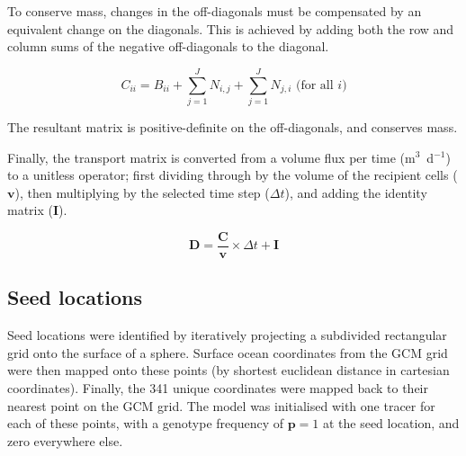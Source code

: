 \documentclass[12pt]{article}
\begin{document}
To conserve mass, changes in the off-diagonals must be compensated by an equivalent change on the diagonals. This is achieved by adding both the row and column sums of the negative off-diagonals to the diagonal. 

\begin{equation}
C_{i i} = B_{i i} + \sum_{j=1}^J N_{i,j} + \sum_{j=1}^J N_{j,i} \text{ (for all $i$)}
\end{equation}

The resultant matrix is positive-definite on the off-diagonals, and conserves mass.

Finally, the transport matrix is converted from a volume flux per time (m$^3$~d$^{-1}$) to a unitless operator; first dividing through by the volume of the recipient cells ($\mathbf{v}$), then multiplying by the selected time step ($\Delta t$), and adding the identity matrix ($\mathbf{I}$).

\begin{equation}
\mathbf{D} = \frac{\mathbf{C}}{\mathbf{v}} \times \Delta t + \mathbf{I}
\end{equation}

\subsection{Seed locations}

Seed locations were identified by iteratively projecting a subdivided rectangular grid onto the surface of a sphere. Surface ocean coordinates from the GCM grid were then mapped onto these points (by shortest euclidean distance in cartesian coordinates). Finally, the 341 unique coordinates were mapped back to their nearest point on the GCM grid. The model was initialised with one tracer for each of these points, with a genotype frequency of $\mathbf{p} = 1$ at the seed location, and zero everywhere else. 




\end{document}
